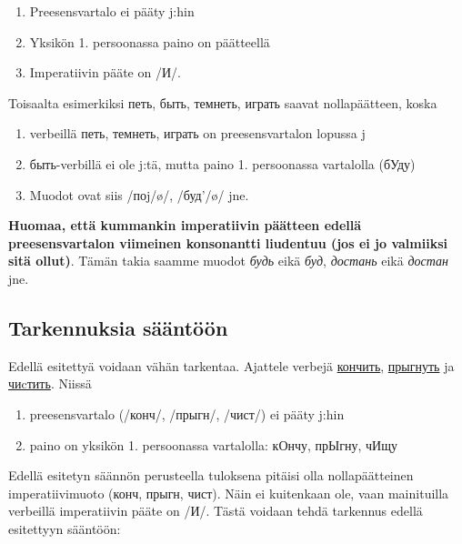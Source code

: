 \documentclass[]{scrreprt}
\providecommand{\tightlist}{%
  \setlength{\itemsep}{0pt}\setlength{\parskip}{0pt}}
\begin{document}
\begin{enumerate}
\def\labelenumi{\arabic{enumi}.}
\tightlist
\item
  Preesensvartalo ei pääty j:hin
\item
  Yksikön 1. persoonassa paino on päätteellä
\item
  Imperatiivin pääte on /И/.
\end{enumerate}

Toisaalta esimerkiksi петь, быть, темнеть, играть saavat nollapäätteen,
koska

\begin{enumerate}
\def\labelenumi{\arabic{enumi}.}
\tightlist
\item
  verbeillä петь, темнеть, играть on preesensvartalon lopussa j
\item
  быть-verbillä ei ole j:tä, mutta paino 1. persoonassa vartalolla
  (бУду)
\item
  Muodot ovat siis /поj/ø/, /буд'/ø/ jne.
\end{enumerate}

\textbf{Huomaa, että kummankin imperatiivin päätteen edellä
preesensvartalon viimeinen konsonantti liudentuu (jos ei jo valmiiksi
sitä ollut)}. Tämän takia saamme muodot \emph{будь} eikä \emph{буд},
\emph{достань} eikä \emph{достан} jne.

\subsection{Tarkennuksia
sääntöön}\label{tarkennuksia-suxe4uxe4ntuxf6uxf6n}

Edellä esitettyä voidaan vähän tarkentaa. Ajattele verbejä
\href{http://ru.wiktionary.org/wiki/\%D0\%BA\%D0\%BE\%D0\%BD\%D1\%87\%D0\%B8\%D1\%82\%D1\%8C}{кончить},
\href{http://ru.wiktionary.org/wiki/\%D0\%BF\%D1\%80\%D1\%8B\%D0\%B3\%D0\%BD\%D1\%83\%D1\%82\%D1\%8C}{прыгнуть}
ja \href{http://ru.wiktionary.org/wiki/\%D1\%87\%D0\%B8cтить}{чиcтить}.
Niissä

\begin{enumerate}
\def\labelenumi{\arabic{enumi}.}
\tightlist
\item
  preesensvartalo (/конч/, /прыгн/, /чист/) ei pääty j:hin
\item
  paino on yksikön 1. persoonassa vartalolla: кОнчу, прЫгну, чИщу
\end{enumerate}

Edellä esitetyn säännön perusteella tuloksena pitäisi olla
nollapäätteinen imperatiivimuoto (конч, прыгн, чист). Näin ei kuitenkaan
ole, vaan mainituilla verbeillä imperatiivin pääte on /И/. Tästä voidaan
tehdä tarkennus edellä esitettyyn sääntöön:
\end{document}
